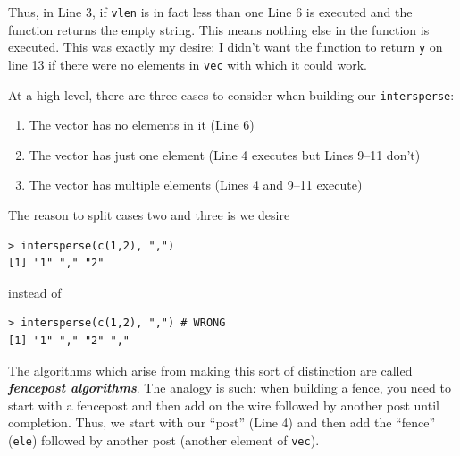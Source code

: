 \documentclass[12pt]{article}
\theoremstyle{remark}
\newcommand{\vocab}[1]{\textbf{\emph{#1}}}
\begin{document}
Thus, in Line 3, if \verb|vlen| is in fact less than one Line 6 is executed and the function returns the empty string. This means nothing else in the function is executed. This was exactly my desire: I didn't want the function to return \verb|y| on line 13 if there were no elements in \verb|vec| with which it could work.


At a high level, there are three cases to consider when building our \verb|intersperse|:

\begin{enumerate}
	\item The vector has no elements in it (Line 6)
	\item The vector has just one element (Line 4 executes but Lines 9--11 don't)
	\item The vector has multiple elements (Lines 4 and 9--11 execute)
\end{enumerate}
The reason to split cases two and three is we desire
\begin{verbatim}
> intersperse(c(1,2), ",")
[1] "1" "," "2"
\end{verbatim}
instead of
\begin{verbatim}
> intersperse(c(1,2), ",") # WRONG
[1] "1" "," "2" ","
\end{verbatim}

The algorithms which arise from making this sort of distinction are called \vocab{fencepost algorithms}. The analogy is such: when building a fence, you need to start with a fencepost and then add on the wire followed by another post until completion. Thus, we start with our ``post'' (Line 4) and then add the ``fence'' (\verb|ele|) followed by another post (another element of \verb|vec|).
\end{document}
